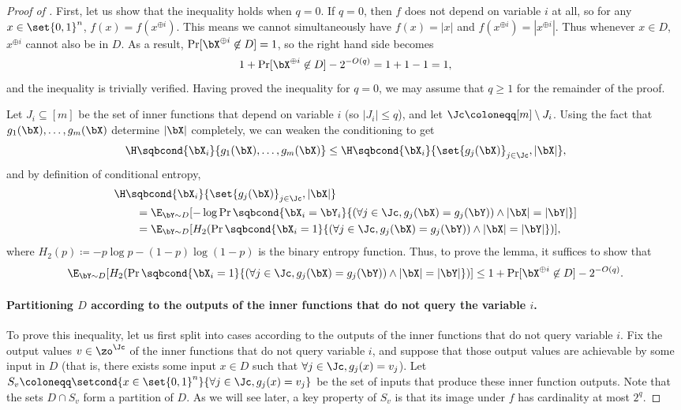 \begin{proof}[Proof of ]
First, let us show that the inequality holds when $q = 0$.
If $q=0$, then $f$ does not depend on variable $i$ at all, so for any $x \in \set{0,1}^n$, $f(x) = f(x^{\oplus i})$.
This means we cannot simultaneously have $f(x) = |x|$ and $f(x^{\oplus i}) = |x^{\oplus i}|$.
Thus whenever $x \in D$, $x^{\oplus i}$ cannot also be in $D$.
As a result, $\Pr[\bX^{\oplus i} \not\in D] = 1$, so the right hand side becomes
\[1 + \Pr[\bX^{\oplus i} \not\in D] - 2^{-O(q)} = 1 + 1 - 1 = 1,\]
and the inequality is trivially verified.
Having proved the inequality for $q=0$, we may assume that $q \geq 1$ for the remainder of the proof.

Let $J_i \subseteq [m]$ be the set of inner functions that depend on variable $i$ (so $|J_i| \leq q$), and let $\Jc \coloneqq [m] \setminus J_i$.
Using the fact that $g_1(\bX), \ldots, g_m(\bX)$ determine $|\bX|$ completely, we can weaken the conditioning to get
\[
\H\sqbcond{\bX_i}{g_1(\bX), \ldots, g_m(\bX)}
\leq \H\sqbcond{\bX_i}{\set{g_j(\bX)}_{j \in \Jc}, |\bX|},
\]
and by definition of conditional entropy,
\begin{align*}
&\H\sqbcond{\bX_i}{\set{g_j(\bX)}_{j \in \Jc}, |\bX|}\\
&\qquad= \E_{\bY \sim D}[-\log\Pr\sqbcond{\bX_i=\bY_i}{(\forall j \in \Jc, g_j(\bX)=g_j(\bY))\wedge|\bX|=|\bY|}]\\
&\qquad= \E_{\bY \sim D}[H_2(\Pr\sqbcond{\bX_i=1}{(\forall j \in \Jc, g_j(\bX)=g_j(\bY))\wedge|\bX|=|\bY|})],
\end{align*}
where $H_2(p) \coloneqq -p\log p - (1-p)\log(1-p)$ is the binary entropy function.
Thus, to prove the lemma, it suffices to show that
\begin{equation}
    \label{eq:really-want}
    \E_{\bY \sim D}[H_2(\Pr\sqbcond{\bX_i=1}{(\forall j \in \Jc, g_j(\bX)=g_j(\bY))\wedge|\bX|=|\bY|})] \leq 1+\Pr[\bX^{\oplus i} \not\in D]-2^{-O(q)}.
\end{equation}

\paragraph*{Partitioning $D$ according to the outputs of the inner functions that do not query the variable $i$.} To prove this inequality, let us first split into cases according to the outputs of the inner functions that do not query variable $i$.
Fix the output values $v \in \zo^\Jc$ of the inner functions that do not query variable $i$, and suppose that those output values are achievable by some input in $D$ (that is, there exists some input $x \in D$ such that $\forall j \in \Jc, g_j(x) = v_j$).
Let $S_v \coloneqq \setcond{x \in \set{0,1}^n}{\forall j \in \Jc, g_j(x) = v_j}$ be the set of inputs that produce these inner function outputs.
Note that the sets $D \cap S_v$ form a partition of $D$.
As we will see later, a key property of $S_v$ is that its image under $f$ has cardinality at most $2^{q}$.


\end{proof}
